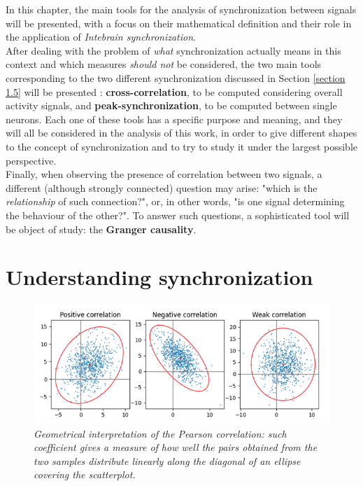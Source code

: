 \documentclass[12pt, a4paper]{report}
\begin{document}
In this chapter, the main tools for the analysis of synchronization between signals will be presented, with a focus on their mathematical definition and their role in the application of \textit{Intebrain synchronization}.\\
After dealing with the problem of \textit{what} synchronization actually means in this context and which measures \textit{should not} be considered, the two main tools corresponding to the two different synchronization discussed in Section \ref{section 1.5} will be presented :\textbf{ cross-correlation}, to be computed considering overall activity signals, and \textbf{peak-synchronization}, to be computed between single neurons. Each one of these tools has a specific purpose and meaning, and they will all be considered in the analysis of this work, in order to give different shapes to the concept of synchronization and to try to study it under the largest possible perspective.\\
Finally, when observing the presence of correlation between two signals, a different (although strongly connected) question may arise: "which is the \textit{relationship} of such connection?", or, in other words, "is one signal determining the behaviour of the other?". To answer such questions, a sophisticated tool will be object of study: the \textbf{Granger causality}.


\section{Understanding synchronization}

\begin{figure}[H]
	\begin{center}
		\includegraphics[scale=.80]{pearson.png} 
	\end{center} 
	\caption{\textit{Geometrical interpretation of the Pearson correlation: such coefficient gives a measure of how well the pairs obtained from the two samples distribute linearly along the diagonal of an ellipse covering the scatterplot. }}
	
\end{figure}
\end{document}
